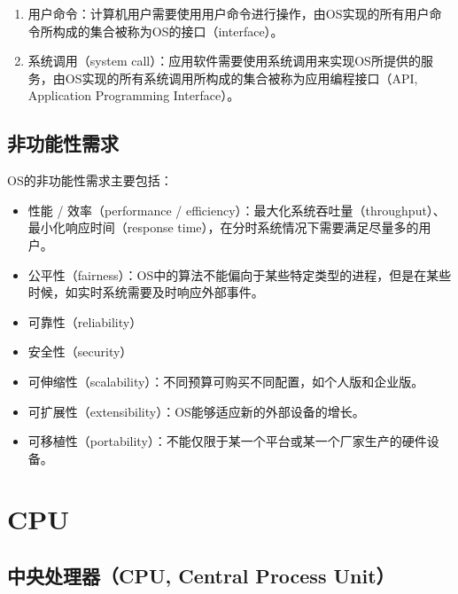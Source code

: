 \begin{enumerate}
	\item 用户命令：计算机用户需要使用用户命令进行操作，由OS实现的所有用户命令所构成的集合被称为OS的接口（interface）。

	\item 系统调用（system call）：应用软件需要使用系统调用来实现OS所提供的服务，由OS实现的所有系统调用所构成的集合被称为应用编程接口（API, Application Programming Interface）。
\end{enumerate}

\vspace{0.5cm}

\subsection{非功能性需求}

OS的非功能性需求主要包括：

\begin{itemize}
	\item 性能 / 效率（performance / efficiency）：最大化系统吞吐量（throughput）、最小化响应时间（response time），在分时系统情况下需要满足尽量多的用户。

	\item 公平性（fairness）：OS中的算法不能偏向于某些特定类型的进程，但是在某些时候，如实时系统需要及时响应外部事件。

	\item 可靠性（reliability）

	\item 安全性（security）

	\item 可伸缩性（scalability）：不同预算可购买不同配置，如个人版和企业版。

	\item 可扩展性（extensibility）：OS能够适应新的外部设备的增长。

	\item 可移植性（portability）：不能仅限于某一个平台或某一个厂家生产的硬件设备。
\end{itemize}

\newpage

\section{CPU}

\subsection{中央处理器（CPU, Central Process Unit）}

